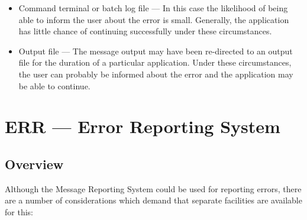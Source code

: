 \begin {itemize}
\begin {itemize}
\item Command terminal or batch log file --- 
In this case the likelihood of being able to inform the user about the error
is small.
Generally, the application has little chance of continuing successfully under
these circumstances.

\item Output file --- 
The message output may have been re-directed to an output file for the
duration of a particular application. 
Under these circumstances, the user can probably be informed about the error
and the application may be able to continue.
\end {itemize}
\end {itemize}


\section {ERR --- Error Reporting System}

\subsection {Overview}

Although the Message Reporting System could be used for reporting errors, there
are a number of considerations which demand that separate facilities are
available for this:

